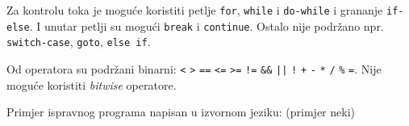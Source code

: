 Za kontrolu toka je moguće koristiti petlje \texttt{for}, \texttt{while} i \texttt{do-while} i grananje \texttt{if-else}. 
I unutar petlji su mogući \texttt{break} i \texttt{continue}.
Ostalo nije podržano npr. \texttt{switch-case}, \texttt{goto}, \texttt{else if}.

Od operatora su podržani binarni: \texttt{<}  \texttt{>}  \texttt{==}  \texttt{<=}  \texttt{>=}  \texttt{!=}  \texttt{\&\&}  \texttt{||}  \texttt{!}  \texttt{+}  \texttt{-}  \texttt{*}  \texttt{/}  \texttt{\%}  \texttt{=}. Nije moguće koristiti \emph{bitwise} operatore.

Primjer ispravnog programa napisan u izvornom jeziku:
(primjer neki)

